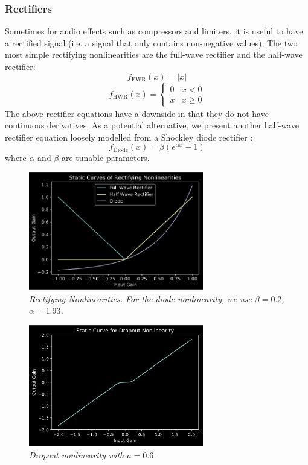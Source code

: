 \documentclass[twoside,a4paper]{article}
\begin{document}
\subsubsection{Rectifiers} \label{sec:rect}
%
Sometimes for audio effects such as compressors and limiters, it is
useful to have a rectified signal (i.e. a signal that only contains
non-negative values). The two most simple rectifying nonlinearities
are the full-wave rectifier and the half-wave rectifier:
%
\begin{equation}
    f_{\text{FWR}}(x) = |x|
    \label{eq:fwr}
\end{equation}
%
\begin{equation}
    f_{\text{HWR}}(x) = \begin{cases}
        0& x < 0 \\
        x& x \geq 0
    \end{cases}
    \label{eq:hwr}
\end{equation}
%
The above rectifier equations have a downside in that they do not have
continuous derivatives. As a potential alternative, we present another
half-wave rectifier equation loosely modelled from a Shockley diode
rectifier \cite{schockley}:
\begin{equation}
    f_{\text{Diode}}(x) = \beta \left(e^{\alpha x} - 1 \right)
    \label{eq:diode}
\end{equation}
%
where $\alpha$ and $\beta$ are tunable parameters.
%
\begin{figure}[!htb]
    \center
    \includegraphics[width=3in]{../Exciter/Pics/rect_static.png}
    \caption{\label{Rects}{\it Rectifying Nonlinearities. For the diode nonlinearity,
    we use $\beta = 0.2$, $\alpha = 1.93$.}}
\end{figure}
%
\begin{figure}[!htb]
    \center
    \includegraphics[width=3in]{Pics/dropout.png}
    \caption{\label{Drops}{\it Dropout nonlinearity with $a = 0.6$.}}
\end{figure}
%
\end{document}
